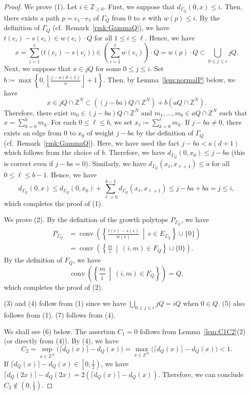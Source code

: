 \documentclass[ALCO,published]{cedram}
\theoremstyle{remark}
\begin{document}
\begin{proof}
We prove (1). 
Let $i \in \mathbb{Z}_{\ge 0}$. 
First, we suppose that $d_{\Gamma _Q} (0,x) \le i$. 
Then, there exists a path $p = e_1 \cdots e_{\ell}$ of $\Gamma _Q$ from $0$ to $x$ with $w(p) \le i$. 
By the definition of $\Gamma _Q$ (cf.\ Remark~\ref{rmk:GammaQ}), we have $t(e_i) - s(e_i) \in w(e_i) \cdot Q$ for all $1 \le i \le \ell$. 
Hence, we have 
\[
x = \sum _{i=1} ^{\ell} \bigl( t(e_i) - s(e_i) \bigr) \in \left( \sum _{i=1} ^{\ell} w(e_i) \right) \cdot Q = w(p) \cdot Q \subset \bigcup _{0 \le j \le i} jQ. 
\]
Next, we suppose that $x \in jQ$ for some $0 \le j \le i$. 
Set $b \coloneqq  \max \left \{ 0,  \left \lfloor \frac{j - a(d+1)}{a} \right \rfloor + 1 \right \}$. 
Then, by Lemma~\ref{lem:normalP} below, we have 
\[
x \in jQ \cap \mathbb{Z}^N \subset \left( (j - ba)Q \cap \mathbb{Z}^N \right) + b \left ( aQ \cap \mathbb{Z}^N \right ). 
\]
Therefore, there exist $m_0 \in (j - ba)Q \cap \mathbb{Z}^N$ and $m_1, \ldots, m_b \in aQ \cap \mathbb{Z}^N$ such that 
$x = \sum_{k=0} ^b m_k$. 
For each $0 \le \ell \le b$, we set $x_{\ell} \coloneqq  \sum _{k=0} ^{\ell} m_k$. 
If $j - ba \not = 0$, there exists an edge from $0$ to $x_0$ of weight $j - ba$ by the definition of $\Gamma _Q$ (cf.\ Remark~\ref{rmk:GammaQ}). 
Here, we have used the fact $j - ba < a(d+1)$ which follows from the choice of $b$. 
Therefore, we have $d_{\Gamma _Q} (0, x_0) \le j - ba$ (this is correct even if $j - ba = 0$). 
Similarly, we have $d_{\Gamma _Q}(x_{\ell}, x_{\ell +1}) \le a$ for all $0 \le \ell \le b-1$. 
Hence, we have 
\[
d_{\Gamma _Q}(0, x) \le  d_{\Gamma _Q} (0, x_0) + \sum _{\ell = 0} ^{b-1} d_{\Gamma _Q}(x_{\ell}, x_{\ell+1}) \le j - ba + ba = j \le i, 
\] 
which completes the proof of (1). 

We prove (2). By the definition of the growth polytope $P_{\Gamma _Q}$, we have 
\begin{align*}
P_{\Gamma _Q} 
&= \operatorname{conv} \left( \left \{ \frac{t(e) - s(e)}{w(e)} \ \middle | \  e \in E_{\Gamma _Q} \right \} \cup \{ 0 \} \right) \\
&= \operatorname{conv} \left( \left \{ \frac{m}{i} \ \middle | \  (i,m) \in F_Q \right \} \cup \{ 0 \} \right). 
\end{align*}
By the definition of $F_Q$, we have 
\[
\operatorname{conv} \left( \left \{ \frac{m}{i} \ \middle | \  (i,m) \in F_Q \right \} \right) = Q, 
\]
which completes the proof of (2). 


(3) and (4) follow from (1) since we have $\bigcup _{0 \le j \le i} jQ = iQ$ when $0 \in Q$. 
(5) also follows from (1). 
(7) follows from (4). 

We shall see (6) below. 
The assertion $C_1 = 0$ follows from Lemma~\ref{lem:C1C2}(2) (or directly from (4)). 
By (4), we have 
\[
C_2 = \sup _{x \in \mathbb{Z}^N} \bigl( \lceil d_Q(x) \rceil - d_Q(x) \bigr)
= \max _{x \in \mathbb{Z}^N} \bigl( \lceil d_Q(x) \rceil - d_Q(x) \bigr)
< 1. 
\]
If $\lceil d_Q(x) \rceil - d_Q(x) \in \left[ 0, \frac{1}{2} \right)$, we have 
$\lceil d_Q(2x) \rceil - d_Q(2x) = 2 (\lceil d_Q(x) \rceil - d_Q(x))$. 
Therefore, we can conclude $C_2 \not \in \left( 0, \frac{1}{2} \right)$. 
\end{proof}
\end{document}
